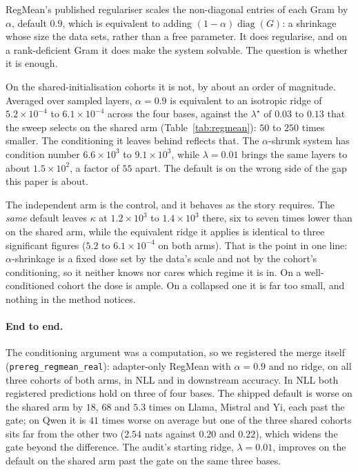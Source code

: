 RegMean's published regulariser scales the non-diagonal entries of each Gram
by $\alpha$, default $0.9$, which is equivalent to adding
$(1-\alpha)\operatorname{diag}(G)$: a shrinkage whose size the data sets,
rather than a free parameter. It does regularise, and on a rank-deficient Gram
it does make the system solvable. The question is whether it is enough.

On the shared-initialisation cohorts it is not, by about an order of
magnitude. Averaged over sampled layers, $\alpha = 0.9$ is equivalent to an
isotropic ridge of $5.2\times10^{-4}$ to $6.1\times10^{-4}$ across the four
bases, against the $\lambda^\star$ of $0.03$ to $0.13$ that the sweep selects on
the shared arm (Table~\ref{tab:regmean}): $50$ to $250$ times smaller. The
conditioning it leaves behind reflects that. The $\alpha$-shrunk system has condition number $6.6\times10^{3}$ to
$9.1\times10^{3}$, while $\lambda = 0.01$ brings the same layers to about
$1.5\times10^{2}$, a factor of $55$ apart. The default is on the wrong side of
the gap this paper is about.

The independent arm is the control, and it behaves as the story requires. The
\emph{same} default leaves $\kappa$ at $1.2\times10^{3}$ to $1.4\times10^{3}$
there, six to seven times lower than on the shared arm, while the equivalent
ridge it applies is identical to three significant figures
($5.2$ to $6.1\times10^{-4}$ on both arms). That is the point in one line:
$\alpha$-shrinkage is a fixed dose set by the data's scale and not by the
cohort's conditioning, so it neither knows nor cares which regime it is in.
On a well-conditioned cohort the dose is ample. On a collapsed one it is
far too small, and nothing in the method notices.

\paragraph{End to end.} The conditioning argument was a computation, so we
registered the merge itself (\texttt{prereg\_regmean\_real}): adapter-only
RegMean with $\alpha = 0.9$ and no ridge, on all three cohorts of both arms, in
NLL and in downstream accuracy. In NLL both registered predictions hold on three
of four bases. The shipped default is worse on the shared arm by $18$, $68$ and
$5.3$ times on Llama, Mistral and Yi, each past the gate; on Qwen it is $41$
times worse on average but one of the three shared cohorts sits far from the
other two ($2.54$ nats against $0.20$ and $0.22$), which widens the gate beyond
the difference. The audit's starting ridge, $\lambda = 0.01$, improves on the
default on the shared arm past the gate on the same three bases.

